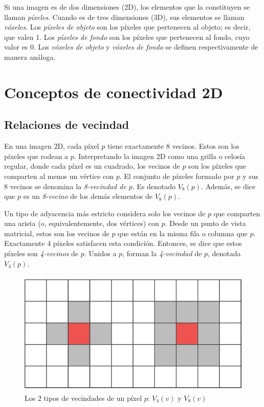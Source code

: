 Si una imagen es de dos dimensiones (2D), los elementos que la constituyen se llaman \textit{píxeles}. Cuando es de tres dimensiones (3D), sus elementos se llaman \textit{vóxeles}. Los \textit{píxeles de objeto} son los píxeles que pertenecen al objeto; es decir, que valen 1. Los \textit{píxeles de fondo} son los píxeles que pertenecen al fondo, cuyo valor es 0. Los \textit{vóxeles de objeto} y \textit{vóxeles de fondo} se definen respectivamente de manera análoga. 

\section{Conceptos de conectividad 2D}

\subsection{Relaciones de vecindad}
En una imagen 2D, cada píxel $p$ tiene exactamente 8 vecinos. Estos son los píxeles que rodean a $p$. Interpretando la imagen 2D como una grilla o celosía regular, donde cada píxel es un cuadrado, los vecinos de $p$ son los píxeles que comparten al menos un vértice con $p$. El conjunto de píxeles formado por $p$ y sus 8 vecinos se denomina la \textit{8-vecindad de $p$}. Es denotado $V_{8}(p)$. Además, se dice que $p$ es un \textit{8-vecino} de los demás elementos de $V_{8}(p)$.

Un tipo de adyacencia más estricto considera solo los vecinos de $p$ que comparten una arista (o, equivalentemente, dos vértices) con $p$. Desde un punto de vista matricial, estos son los vecinos de $p$ que están en la misma fila o columna que $p$. Exactamente 4 píxeles satisfacen esta condición. Entonces, se dice que estos píxeles son \textit{4-vecinos} de $p$. Unidos a $p$, forman la \textit{4-vecindad} de $p$, denotada $V_{4}(p)$.

\begin{figure}[ht]\centering
\includegraphics[width=0.66\linewidth]{images/2dneighborhoods}
\caption{Los 2 tipos de vecindades de un píxel $p$: $V_{4}(v)$ y $V_{8}(v)$}
\label{fig:2dneighborhoods}
\end{figure}


